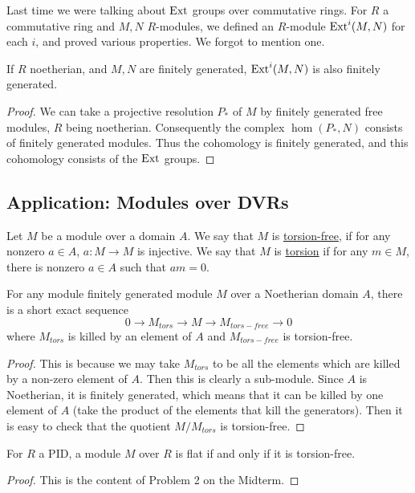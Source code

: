 Last time we were talking about $\operatorname{Ext}$ groups over commutative
rings. For $R$ a
commutative ring and $M,N$ $R$-modules, we defined an $R$-module
$\operatorname{Ext}^i(M,N)$ for
each $i$, and proved various properties. We forgot to mention
one.

\begin{proposition}
If $R$ noetherian, and $M,N$ are finitely generated,
$\operatorname{Ext}^i(M,N)$ is also finitely generated.
\end{proposition}
\begin{proof}
We can take a projective resolution $P_*$ of $M$ by finitely
generated free modules, $R$ being
noetherian. Consequently the complex $\hom(P_*, N)$ consists of
finitely
generated modules. Thus the cohomology is finitely generated,
and this cohomology
consists of the $\operatorname{Ext}$ groups.
\end{proof}

\subsection{Application: Modules over DVRs}


\begin{definition} Let $M$ be a module over a domain $A$. We say that $M$ is \underline{torsion-free}, if for any nonzero $a \in A$, $a:M \to M$ is injective. We say that $M$ is \underline{torsion} if for any $m \in M$, there is nonzero $a \in A$ such that $am=0$.
\end{definition}

\begin{lemma} For any module finitely generated module $M$ over a Noetherian domain $A$, there is a short exact sequence
\[0 \to M_{tors} \to M \to M_{tors-free} \to 0\]
where $M_{tors}$ is killed by an element of $A$ and $M_{tors-free}$ is torsion-free.
\label{tors tors-free ses}
\end{lemma}
\begin{proof} This is because we may take $M_{tors}$ to be all the elements which are killed by a non-zero element of $A$. Then this is clearly a sub-module. Since $A$ is Noetherian, it is finitely generated, which means that it can be killed by one element of $A$ (take the product of the elements that kill the generators). Then it is easy to check that the quotient $M/M_{tors}$ is torsion-free.
\end{proof}

\begin{lemma} For $R$ a PID, a module $M$ over $R$ is flat if and only if it is torsion-free.
\label{PID means flat=tors free}
\end{lemma}
\begin{proof} This is the content of Problem 2 on the Midterm.
\end{proof}

